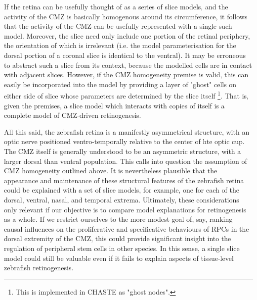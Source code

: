 If the retina can be usefully thought of as a series of slice models, and the activity of the CMZ is basically homogenous around its circumference, it follows that the activity of the CMZ can be usefully represented with a single such model. Moreover, the slice need only include one portion of the retinal periphery, the orientation of which is irrelevant (i.e. the model parameterisation for the dorsal portion of a coronal slice is identical to the ventral). It may be erroneous to abstract such a slice from its context, because the modelled cells are in contact with adjacent slices. However, if the CMZ homogeneity premise is valid, this can easily be incorporated into the model by providing a layer of "ghost" cells on either side of slice whose parameters are determined by the slice itself \footnote{This is implemented in CHASTE as "ghost nodes".}. That is, given the premises, a slice model which interacts with copies of itself is a complete model of CMZ-driven retinogenesis.

All this said, the zebrafish retina is a manifestly asymmetrical structure, with an optic nerve positioned ventro-temporally relative to the center of hte optic cup. The CMZ itself is generally understood to be an asymmetric structure, with a larger dorsal than ventral population. This calls into question the assumption of CMZ homogeneity outlined above. It is nevertheless plausible that the appearance and maintenance of these structural features of the zebrafish retina could be explained with a set of slice models, for example, one for each of the dorsal, ventral, nasal, and temporal extrema. Ultimately, these considerations only relevant if our objective is to compare model explanations for retinogenesis as a whole. If we restrict ourselves to the more modest goal of, say, ranking causal influences on the proliferative and specificative behaviours of RPCs in the dorsal extremity of the CMZ, this could provide significant insight into the regulation of peripheral stem cells in other species. In this sense, a single slice model could still be valuable even if it fails to explain aspects of tissue-level zebrafish retinogenesis.

